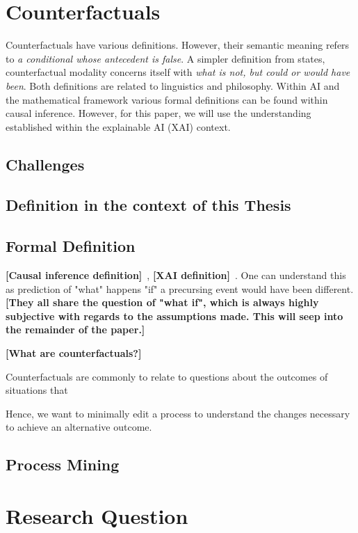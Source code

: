 \documentclass[12pt,a4paper,footinclude=true,headinclude=true]{report}
\newcommand{\attention}[1]{\color{red}\textbf{[#1]}\color{black}~}
\begin{document}
\section{Counterfactuals}

Counterfactuals have various definitions. However, their semantic meaning refers to \emph{a conditional whose antecedent is false}\autocite{_Counterfactual_}. A simpler definition from \citeauthor{starr_Counterfactuals_2021} states, counterfactual modality concerns itself with \emph{what is not, but could or would have been}.
Both definitions are related to linguistics and philosophy. Within AI and the mathematical framework various formal definitions can be found within causal inference\autocite{hitchcock_CausalModels_2020}. However, for this paper, we will use the understanding established within the explainable AI (XAI) context.
\subsection{Challenges}
\subsection{Definition in the context of this Thesis}
\subsection{Formal Definition}


\attention{Causal inference definition}, \attention{XAI definition}.
One can understand this as prediction of "what" happens "if" a precursing event would have been different.
\attention{They all share the question of "what if", which is always highly subjective with regards to the assumptions made. This will seep into the remainder of the paper.}

\attention{What are counterfactuals?}

Counterfactuals are commonly to relate to questions about the outcomes of situations that

Hence, we want to minimally edit a process to understand the changes necessary to achieve an alternative outcome.

\subsection{Process Mining}


\section{Research Question}
\end{document}
